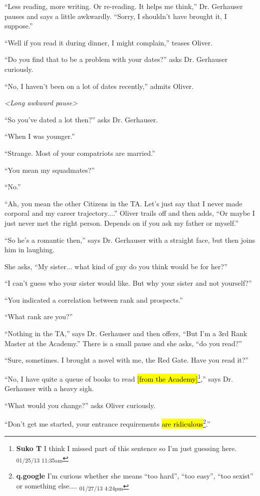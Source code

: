 ``Less reading, more writing.  Or re-reading.  It helps me think,'' Dr. Gerhauser pauses and says a little awkwardly.  ``Sorry, I shouldn't have brought it, I suppose.''

``Well if you read it during dinner, I might complain,'' teases Oliver.

``Do you find that to be a problem with your dates?'' asks Dr. Gerhauser curiously.

``No, I haven't been on a lot of dates recently,'' admits Oliver.

\textit{\textless Long awkward pause\textgreater }

``So you've dated a lot then?'' asks Dr. Gerhauser.

``When I was younger.''

``Strange.  Most of your compatriots are married.''

``You mean my squadmates?''

``No.''

``Ah, you mean the other Citizens in the TA.  Let's just say that I never made corporal and my career trajectory....'' Oliver trails off and then adds, ``Or maybe I just never met the right person.  Depends on if you ask my father or myself.''

``So he's a romantic then,'' says Dr. Gerhauser with a straight face, but then joins him in laughing.

She asks, ``My sister... what kind of guy do you think would be for her?''

``I can't guess who your sister would like.  But why your sister and not yourself?''

``You indicated a correlation between rank and prospects.''

``What rank are you?''

``Nothing in the TA,'' says Dr. Gerhauser and then offers, ``But I'm a 3rd Rank Master at the Academy.''  There is a small pause and she asks, ``do you read?''

``Sure, sometimes.  I brought a novel with me, the Red Gate.  Have you read it?''

``No, I have quite a queue of books to read \hl{{[}from the Academy{]}}\footnote{\textbf{Suko T }I think I missed part of this sentence so I'm just guessing here. \textsubscript{01/25/13 11:35am}},'' says Dr. Gerhauser with a heavy sigh.

``What would you change?'' asks Oliver curiously.

``Don't get me started, your entrance requirements \hl{are ridiculous}\footnote{\textbf{q.google }I'm curious whether she means ``too hard'', ``too easy'', ``too sexist'' or something else.... \textsubscript{01/27/13 4:24pm}}.''

